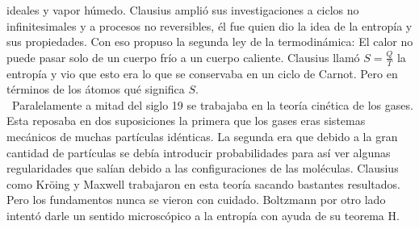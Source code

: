 ideales y vapor húmedo. Clausius amplió sus investigaciones a ciclos no infinitesimales y a procesos no reversibles, él fue quien dio la idea de la entropía y sus propiedades. Con eso propuso la segunda ley de la termodinámica: El calor no puede pasar solo de un cuerpo frío a un cuerpo caliente. Clausius llamó $S=\frac{Q}{T}$ la entropía y vio que esto era lo que se conservaba en un ciclo de Carnot. Pero en términos de los átomos qué significa $S$.
\\\
Paralelamente a mitad del siglo 19 se trabajaba en la teoría cinética de los gases. Esta reposaba en dos suposiciones la primera que los gases eras sistemas mecánicos de muchas partículas idénticas. La segunda era que debido a la gran cantidad de partículas se debía introducir probabilidades para así ver algunas regularidades que salían debido a las configuraciones de las moléculas. Clausius como Kröing y Maxwell trabajaron en esta teoría sacando bastantes resultados. Pero los fundamentos nunca se vieron con cuidado. Boltzmann por otro lado intentó darle un sentido microscópico a la entropía con ayuda de su teorema H.


































